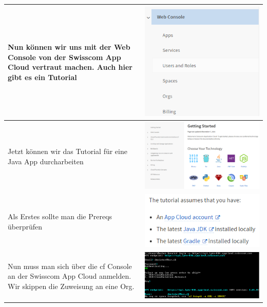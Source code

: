 \begin{longtable}{| p{5cm} | p{11cm} |}
Nun können wir uns mit der Web Console von der Swisscom App Cloud vertraut machen. Auch hier gibt es ein Tutorial 
&\includegraphics[width=0.65\columnwidth, valign=T]{images/image4.png} \\ \hline
Jetzt können wir das Tutorial für eine Java App durcharbeiten &\includegraphics[width=0.65\columnwidth, valign=T]{images/image1.png} \\ \hline
Als Erstes sollte man die Prereqs überprüfen 
&\includegraphics[width=0.65\columnwidth, valign=T]{images/image5.png} \\ \hline
Nun muss man sich über die cf Console an der Swisscom App Cloud anmelden. Wir skippen die Zuweisung an eine Org. 
&\includegraphics[width=0.65\columnwidth, valign=T]{images/image6.png} \\ \hline

\end{longtable}
